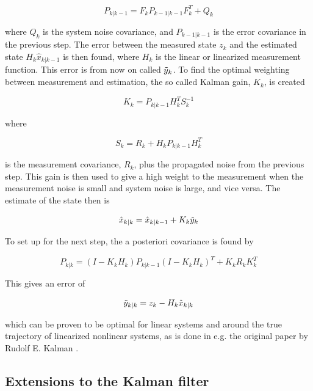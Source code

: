 \begin{equation}
    P_{k|k-1} = F_k P_{k-1|k-1} F^T_{k} + Q_k
\end{equation}

where $Q_k$ is the system noise covariance, and $P_{k-1|k-1}$ is the error covariance in the previous step. The error between the measured state $z_k$ and the estimated state $H_k \hat{x}_{k|k-1}$ is then found, where $H_k$ is the linear or linearized measurement function. This error is from now on called $\Tilde{y}_k$. To find the optimal weighting between measurement and estimation, the so called Kalman gain, $K_k$, is created

\begin{equation}
    K_k = P_{k|k-1}H^T_kS^{-1}_k
\end{equation}

where 

\begin{equation}
    S_k = R_k + H_kP_{k|k-1}H^T_k
\end{equation}

is the measurement covariance, $R_k$, plus the propagated noise from the previous step. This gain is then used to give a high weight to the measurement when the measurement noise is small and system noise is large, and vice versa. The estimate of the state then is

\begin{equation}
    \hat{x}_{k|k} = \hat{x}_{k|k-1} + K_k\Tilde{y}_k
\end{equation}

To set up for the next step, the a posteriori covariance is found by

\begin{equation}
    P_{k|k} = (I-K_kH_k)P_{k|k-1}(I-K_kH_k)^T + K_kR_kK^T_k
\end{equation}

This gives an error of 

\begin{equation}
    \Tilde{y}_{k|k} = z_k - H_k\hat{x}_{k|k}
\end{equation}

which can be proven to be optimal for linear systems and around the true trajectory of linearized nonlinear systems, as is done in e.g. the original paper by Rudolf E. Kalman \cite{kalmanOG}.

\subsection{Extensions to the Kalman filter}

